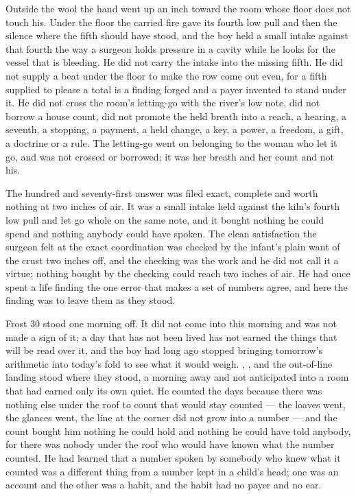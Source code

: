 Outside the wool the hand went up an inch toward the room whose floor does not touch his. Under the floor the carried fire gave its fourth low pull and then the silence where the fifth should have stood, and the boy held a small intake against that fourth the way a surgeon holds pressure in a cavity while he looks for the vessel that is bleeding. He did not carry the intake into the missing fifth. He did not supply a beat under the floor to make the row come out even, for a fifth supplied to please a total is a finding forged and a payer invented to stand under it. He did not cross the room's letting-go with the river's low note, did not borrow a house count, did not promote the held breath into a reach, a hearing, a seventh, a stopping, a payment, a held change, a key, a power, a freedom, a gift, a doctrine or a rule. The letting-go went on belonging to the woman who let it go, and was not crossed or borrowed; it was her breath and her count and not his.

The hundred and seventy-first answer was filed exact, complete and worth nothing at two inches of air. It was a small intake held against the kiln's fourth low pull and let go whole on the same note, and it bought nothing he could spend and nothing anybody could have spoken. The clean satisfaction the surgeon felt at the exact coordination was checked by the infant's plain want of the crust two inches off, and the checking was the work and he did not call it a virtue; nothing bought by the checking could reach two inches of air. He had once spent a life finding the one error that makes a set of numbers agree, and here the finding was to leave them as they stood.

Frost 30 stood one morning off. It did not come into this morning and was not made a sign of it; a day that has not been lived has not earned the things that will be read over it, and the boy had long ago stopped bringing tomorrow's arithmetic into today's fold to see what it would weigh. , ,  and the out-of-line landing stood where they stood, a morning away and not anticipated into a room that had earned only its own quiet. He counted the days because there was nothing else under the roof to count that would stay counted --- the loaves went, the glances went, the line at the corner did not grow into a number --- and the count bought him nothing he could hold and nothing he could have told anybody, for there was nobody under the roof who would have known what the number counted. He had learned that a number spoken by somebody who knew what it counted was a different thing from a number kept in a child's head; one was an account and the other was a habit, and the habit had no payer and no ear.

